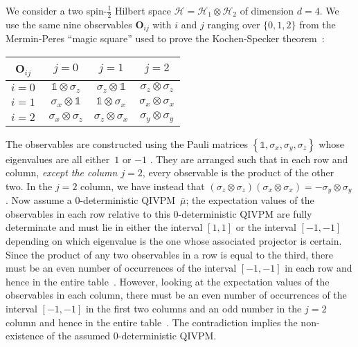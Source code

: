 \documentclass[english,reprint, aps, prl,superscriptaddress, showpacs,
showkeys, longbibliography, amsmath, amssymb, floatfix]{revtex4-1}
\theoremstyle{plain}
\theoremstyle{definition}
\newcommand{\Hilb}{\mathcal{H}}
\begin{document}
We consider a two spin-$\frac{1}{2}$ Hilbert space
$\Hilb=\Hilb_1\otimes\Hilb_2$ of dimension $d=4$. We use the same nine
observables $\mathbf{O}_{ij}$ with $i$ and $j$ ranging over
$\{0,1,2\}$ from the Mermin-Peres ``magic square'' used to prove the
Kochen-Specker
theorem~\cite{Mermin1990Simple,peres1995quantum,Griffiths2003}:

{\renewcommand{\arraystretch}{2}%
\begin{center}
\begin{tabular}{r|@{\quad}c@{\quad}|@{\quad}c@{\quad}|@{\quad}c@{\quad}|}
$\mathbf{O}_{ij}$~ & $j=0$ & $j=1$ & $j=2$ \\
\hline 
$i=0~$ & $\mathbb{1}\otimes\sigma_{z}$  & $\sigma_{z}\otimes\mathbb{1}$  & $\sigma_{z}\otimes\sigma_{z}$ \tabularnewline
\hline 
$i=1~$ & $\sigma_{x}\otimes\mathbb{1}$  & $\mathbb{1}\otimes\sigma_{x}$  & $\sigma_{x}\otimes\sigma_{x}$ \tabularnewline
\hline 
$i=2~$ & $\sigma_{x}\otimes\sigma_{z}$  & $\sigma_{z}\otimes\sigma_{x}$  & $\sigma_{y}\otimes\sigma_{y}$ \tabularnewline
\hline 
\end{tabular}
\par\end{center}
} 

\noindent The observables are constructed using the Pauli matrices
$\left\{ \mathbb{1},\sigma_{x},\sigma_{y},\sigma_{z}\right\}$ whose
eigenvalues are all either~$1$ or $-1$
\cite{Redhead1987-REDINA,544199,Griffiths2003,Jaeger2007,Mermin2007}.
They are arranged such that in
each row and column, \emph{except the column $j=2$}, every observable
is the product of the other two. In the $j=2$ column, we have instead
that
$\left(\sigma_{z}\otimes\sigma_{z}\right)\left(\sigma_{x}\otimes\sigma_{x}\right)=-\sigma_{y}\otimes\sigma_{y}$. Now
assume a 0-deterministic QIVPM~${\bar{\mu}}$; the expectation values
of the observables in each row relative to this 0-deterministic QIVPM
are fully determinate and must lie in either the interval $[1,1]$ or
the interval $[-1,-1]$ depending on which eigenvalue is the one whose
associated projector is certain. Since the product of any two
observables in a row is equal to the third, there must be an even
number of occurrences of the interval $[-1,-1]$ in each row and hence
in the entire table~\citep{TaiThesis2018}. However, looking at the expectation values of the
observables in each column, there must be an even number of
occurrences of the interval $[-1,-1]$ in the first two columns and an
odd number in the $j=2$ column and hence in the entire table~\citep{TaiThesis2018}. The
contradiction implies the non-existence of the assumed 0-deterministic
QIVPM. 
\end{document}
